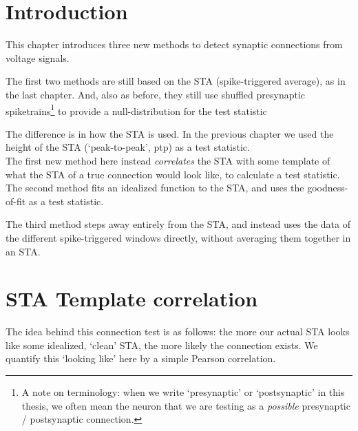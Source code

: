 
\section{Introduction}

This chapter introduces three new methods to detect synaptic connections from voltage signals.

The first two methods are still based on the STA (spike-triggered average), as in the last chapter. And, also as before, they still use shuffled presynaptic spiketrains\footnote{
    A note on terminology: when we write `presynaptic' or `postsynaptic' in this thesis, we often mean the neuron that we are testing as a \emph{possible} presynaptic / postsynaptic connection.
}
to provide a null-distribution for the test statistic

The difference is in how the STA is used. In the previous chapter we used the height of the STA (`peak-to-peak', ptp) as a test statistic.\\
The first new method here instead \emph{correlates} the STA with some template of what the STA of a true connection would look like, to calculate a test statistic.\\
The second method fits an idealized function to the STA, and uses the goodness-of-fit as a test statistic.

The third method steps away entirely from the STA, and instead uses the data of the different spike-triggered windows directly, without averaging them together in an STA.





\clearpage
\section{STA Template correlation}


The idea behind this connection test is as follows: the more our actual STA looks like some idealized, `clean' STA, the more likely the connection exists. We quantify this `looking like' here by a simple Pearson correlation.

